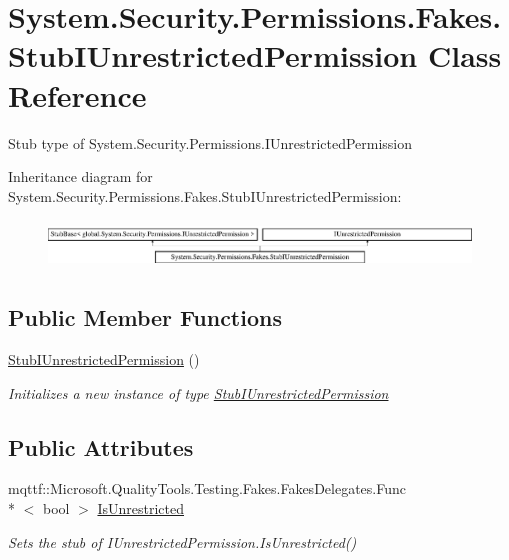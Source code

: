 \hypertarget{class_system_1_1_security_1_1_permissions_1_1_fakes_1_1_stub_i_unrestricted_permission}{\section{System.\-Security.\-Permissions.\-Fakes.\-Stub\-I\-Unrestricted\-Permission Class Reference}
\label{class_system_1_1_security_1_1_permissions_1_1_fakes_1_1_stub_i_unrestricted_permission}
}


Stub type of System.\-Security.\-Permissions.\-I\-Unrestricted\-Permission 


Inheritance diagram for System.\-Security.\-Permissions.\-Fakes.\-Stub\-I\-Unrestricted\-Permission\-:\begin{figure}[H]
\begin{center}
\leavevmode
\includegraphics[height=1.293303cm]{class_system_1_1_security_1_1_permissions_1_1_fakes_1_1_stub_i_unrestricted_permission}
\end{center}
\end{figure}
\subsection*{Public Member Functions}
\begin{DoxyCompactItemize}
\item 
\hyperlink{class_system_1_1_security_1_1_permissions_1_1_fakes_1_1_stub_i_unrestricted_permission_a02f544c9be357812da6a213841de6577}{Stub\-I\-Unrestricted\-Permission} ()
\begin{DoxyCompactList}\small\item\em Initializes a new instance of type \hyperlink{class_system_1_1_security_1_1_permissions_1_1_fakes_1_1_stub_i_unrestricted_permission}{Stub\-I\-Unrestricted\-Permission}\end{DoxyCompactList}\end{DoxyCompactItemize}
\subsection*{Public Attributes}
\begin{DoxyCompactItemize}
\item 
mqttf\-::\-Microsoft.\-Quality\-Tools.\-Testing.\-Fakes.\-Fakes\-Delegates.\-Func\\*
$<$ bool $>$ \hyperlink{class_system_1_1_security_1_1_permissions_1_1_fakes_1_1_stub_i_unrestricted_permission_ad5dd1fe5b0707ce25deef9049813467f}{Is\-Unrestricted}
\begin{DoxyCompactList}\small\item\em Sets the stub of I\-Unrestricted\-Permission.\-Is\-Unrestricted()\end{DoxyCompactList}\end{DoxyCompactItemize}


